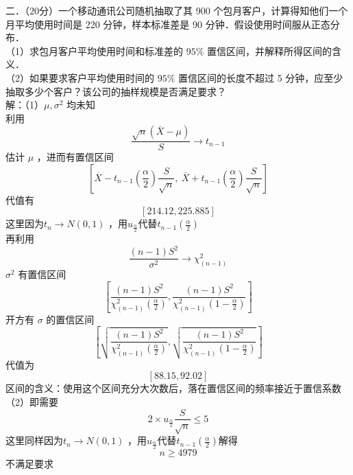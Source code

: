 \documentclass[UTF8]{ctexart}
\begin{document}
\noindent 二．（20分）一个移动通讯公司随机抽取了其 900 个包月客户，计算得知他们一个月平均使用时间是 220 分钟，样本标准差是 90 分钟．假设使用时间服从正态分布．\\
（1）求包月客户平均使用时间和标准差的 $95 \%$ 置信区间，并解释所得区间的含义．\\
（2）如果要求客户平均使用时间的 $95 \%$ 置信区间的长度不超过 5 分钟，应至少抽取多少个客户？该公司的抽样规模是否满足要求？\\
解：（1）$\mu, \sigma^2$ 均未知\\
利用 
$$\frac{\sqrt{n}(\overline{X}-\mu)}{S} \rightarrow t_{n-1}$$
估计 $\mu$ ，进而有置信区间
\[
\left[ \overline{X} - t_{n-1}\left(\frac{\alpha}{2}\right) \frac{S}{\sqrt{n}},\ 
\overline{X} + t_{n-1}\left(\frac{\alpha}{2}\right) \frac{S}{\sqrt{n}} \right]
\]
代值有
$$[214.12,225.885]$$ 
这里因为$t_n\rightarrow N(0,1)$ ，用$u_{\frac{\alpha}{2}}$代替$t_{n-1}\left(\frac{\alpha}{2}\right)$\\
再利用 
$$\frac{(n-1) S^2}{\sigma^2} \rightarrow \chi^2_{(n-1)}$$
$\sigma^2$ 有置信区间 
$$\left[\frac{(n-1) S^2}{\chi^2_{(n-1)}\left(\frac{\alpha}{2}\right)}, \frac{(n-1) S^2}{\chi^2_{(n-1)}\left(1-\frac{\alpha}{2}\right)}\right]$$
开方有 $\sigma$ 的置信区间
$$
\left[\sqrt{\frac{(n-1) S^2}{\chi^2_{(n-1)}\left(\frac{\alpha}{2}\right)}},\sqrt{\frac{(n-1) S^2}{\chi^2_{(n-1)}\left(1-\frac{\alpha}{2}\right)}}\right]
$$
代值为
\[
[88.15,92.02]
\]
区间的含义：使用这个区间充分大次数后，落在置信区间的频率接近于置信系数\\
（2）即需要
\[
2\times u_{\frac{\alpha}{2}}\frac{S}{\sqrt{n}}\le 5
\]
这里同样因为$t_n\rightarrow N(0,1)$ ，用$u_{\frac{\alpha}{2}}$代替$t_{n-1}\left(\frac{\alpha}{2}\right)$解得
\[
n\ge 4979
\]
不满足要求\\
\end{document}
